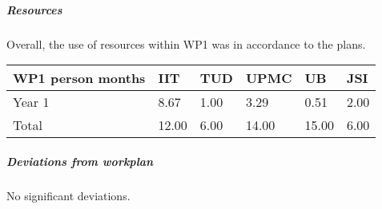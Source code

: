 

\subparagraph{Resources}
Overall, the use of resources within WP1 was in accordance to the plans. 

\begin{center}
\begin{tabular}{|C{1.5cm}|C{1.5cm}|C{1.5cm}|C{2cm}|C{2cm}|C{2cm}|}
\hline
\footnotesize \textbf{WP1 person months}& \footnotesize \textbf{IIT}&\footnotesize \textbf{TUD}&\footnotesize \textbf{UPMC}& \footnotesize \textbf{UB} &\footnotesize \textbf{JSI}\\ \hline
\footnotesize Year 1 &  8.67 &1.00 & 3.29 & 0.51 & 2.00      \\  \hline
\footnotesize Total &  12.00 & 6.00 & 14.00 & 15.00 & 6.00 \\ \hline
\end{tabular}
\end{center}

\subparagraph{Deviations from workplan} 
No significant deviations. 